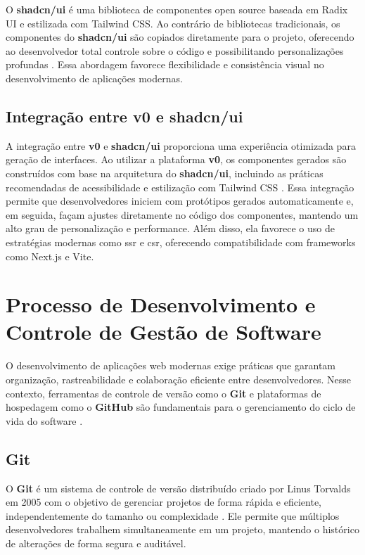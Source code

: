 O \textbf{shadcn/ui} é uma biblioteca de componentes open source baseada em Radix UI e estilizada com Tailwind CSS. Ao contrário de bibliotecas tradicionais, os componentes do \textbf{shadcn/ui} são copiados diretamente para o projeto, oferecendo ao desenvolvedor total controle sobre o código e possibilitando personalizações profundas \cite{shadcn_docs}. Essa abordagem favorece flexibilidade e consistência visual no desenvolvimento de aplicações modernas.

\subsection{Integração entre v0 e shadcn/ui}
\label{subsec:integracao-v0-shadcn}

A integração entre \textbf{v0} e \textbf{shadcn/ui} proporciona uma experiência otimizada para geração de interfaces. Ao utilizar a plataforma \textbf{v0}, os componentes gerados são construídos com base na arquitetura do \textbf{shadcn/ui}, incluindo as práticas recomendadas de acessibilidade e estilização com Tailwind CSS \cite{v0_docs, shadcn_docs}. Essa integração permite que desenvolvedores iniciem com protótipos gerados automaticamente e, em seguida, façam ajustes diretamente no código dos componentes, mantendo um alto grau de personalização e performance. Além disso, ela favorece o uso de estratégias modernas como \acrshort{ssr} e \acrshort{csr}, oferecendo compatibilidade com frameworks como Next.js e Vite.




\section{Processo de Desenvolvimento e Controle de Gestão de Software}
\label{sec:git-github}

O desenvolvimento de aplicações web modernas exige práticas que garantam organização, rastreabilidade e colaboração eficiente entre desenvolvedores. Nesse contexto, ferramentas de controle de versão como o \textbf{Git} e plataformas de hospedagem como o \textbf{GitHub} são fundamentais para o gerenciamento do ciclo de vida do software \cite{github_official}.

\subsection{Git}
\label{subsec:git}

O \textbf{Git} é um sistema de controle de versão distribuído criado por Linus Torvalds em 2005 com o objetivo de gerenciar projetos de forma rápida e eficiente, independentemente do tamanho ou complexidade \cite{chacon_git}. Ele permite que múltiplos desenvolvedores trabalhem simultaneamente em um projeto, mantendo o histórico de alterações de forma segura e auditável.

